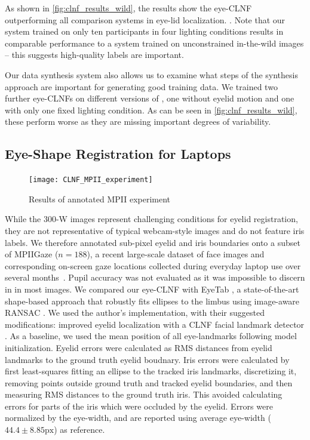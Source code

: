 As shown in \autoref{fig:clnf_results_wild}, the results show the eye-CLNF outperforming all comparison systems in eye-lid localization. . Note that our system trained on only ten participants in four lighting conditions results in comparable performance to a system trained on unconstrained in-the-wild images -- this suggests high-quality labels are important.

Our data synthesis system also allows us to examine what steps of the synthesis approach are important for generating good training data. We trained two further eye-CLNFs on different versions of \dataset, one without eyelid motion and one with only one fixed lighting condition. As can be seen in \autoref{fig:clnf_results_wild}, these perform worse as they are missing important degrees of variability.

\subsection{Eye-Shape Registration for Laptops}


\begin{figure}
    \centering
    \texttt{[image: CLNF\_MPII\_experiment]}
    \caption{Results of annotated MPII experiment}
    \label{fig:clnf_results_MPII}
\end{figure}



While the 300-W images represent challenging conditions for eyelid registration, they are not representative of typical webcam-style images and do not feature iris labels.
We therefore annotated sub-pixel eyelid and iris boundaries onto a subset of MPIIGaze ($n\!=\!188$), a recent large-scale dataset of face images and corresponding on-screen gaze locations collected during everyday laptop use over several months~\cite{zhang15_cvpr}.
Pupil accuracy was not evaluated as it was impossible to discern in in most images.
We compared our eye-CLNF with EyeTab \cite{wood2014eyetab}, a state-of-the-art shape-based approach that robustly fits ellipses to the limbus using image-aware RANSAC \cite{swirski2012robust}.
We used the author's implementation, with their suggested modifications: improved eyelid localization with a CLNF facial landmark detector \cite{baltrusaitis2013constrained}.
As a baseline, we used the mean position of all eye-landmarks following model initialization.
Eyelid errors were calculated as RMS distances from eyelid landmarks to the ground truth eyelid boudnary.
Iris errors were calculated by first least-squares fitting an ellipse to the tracked iris landmarks, discretizing it, removing points outside ground truth and tracked eyelid boundaries, and then measuring RMS distances to the ground truth iris.
This avoided calculating errors for parts of the iris which were occluded by the eyelid.
Errors were normalized by the eye-width, and are reported using average eye-width ($44.4\!\pm\!8.85\textrm{px}$) as reference.

